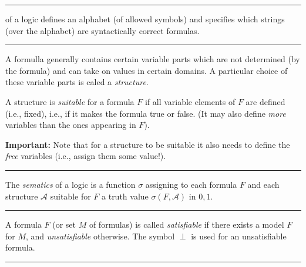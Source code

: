 \documentclass[a4paper]{extarticle}
\newcommand{\cA}{\mathcal{A}}
\newcommand{\cS}{\mathcal{S}}
\newcommand{\sep}{\vspace{5pt}\noindent\hrule\vspace{5pt}}
\begin{document}
\begin{multicols*}{2}

\sep

\Def[Syntax] of a logic defines  an alphabet (of allowed symbols) and specifies
which strings (over the alphabet) are syntactically correct formulas.

\sep

\Def[Structure] A formulla generally contains certain variable parts which are
not determined (by the formula) and can take on values in certain domains. A
particular choice of these variable parts is caled a \emph{structure}.

 A structure is \emph{suitable} for a formula $F$ if all
variable elements of $F$ are defined (i.e., fixed), i.e., if it makes the
formula true or false. (It may also define \emph{more} variables than the ones
appearing in $F$).

\textbf{Important:} Note that for a structure to be suitable it also needs to
define the \emph{free} variables (i.e., assign them some value!).

\sep

\Def[Semantics] The \emph{sematics} of a logic is a function $\sigma$ assigning
to each formula $F$ and each structure $\cA$ suitable for $F$ a truth value
$\sigma(F,\cA)$ in ${0,1}$.

\sep

\Def[Model] A formula $F$ (or set $M$ of formulas) is called \emph{satisfiable}
if there exists a model $F$ for $M$, and \emph{unsatisfiable} otherwise. The
symbol $\perp$ is used for an unsatisfiable formula.

\sep


\end{multicols*}
\end{document}
